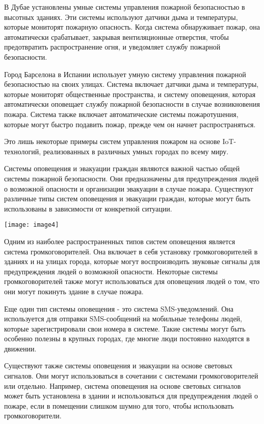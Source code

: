 \begin{multicols}{2}
В Дубае установлены умные системы управления пожарной безопасностью в
высотных зданиях. Эти системы используют датчики дыма и температуры,
которые мониторят пожарную опасность. Когда система обнаруживает
пожар, она автоматически срабатывает, закрывая вентиляционные
отверстия, чтобы предотвратить распространение огня, и уведомляет
службу пожарной безопасности.

Город Барселона в Испании использует умную систему управления пожарной
безопасностью на своих улицах. Система включает датчики дыма и
температуры, которые мониторят общественные пространства, и систему
оповещения, которая автоматически оповещает службу пожарной
безопасности в случае возникновения пожара. Система также включает
автоматические системы пожаротушения, которые могут быстро подавить
пожар, прежде чем он начнет распространяться.

Это лишь некоторые примеры систем управления пожаром на основе
IoT-технологий, реализованных в различных умных городах по всему миру.

Системы оповещения и эвакуации граждан являются важной частью общей
системы пожарной безопасности. Они предназначены для предупреждения
людей о возможной опасности и организации эвакуации в случае пожара.
Существуют различные типы систем оповещения и эвакуации граждан, которые
могут быть использованы в зависимости от конкретной ситуации.

{\centering
\texttt{[image: image4]}
}

Одним из наиболее распространенных типов систем оповещения является
система громкоговорителей. Она включает в себя установку
громкоговорителей в зданиях и на улицах города, которые могут
воспроизводить звуковые сигналы для предупреждения людей о возможной
опасности. Некоторые системы громкоговорителей также могут
использоваться для оповещения людей о том, что они могут покинуть здание
в случае пожара.

Еще один тип системы оповещения - это система SMS-уведомлений. Она
используется для отправки SMS-сообщений на мобильные телефоны людей,
которые зарегистрировали свои номера в системе. Такие системы могут быть
особенно полезны в крупных городах, где многие люди постоянно находятся
в движении.

Существуют также системы оповещения и эвакуации на основе световых
сигналов. Они могут использоваться в сочетании с системами
громкоговорителей или отдельно. Например, система оповещения на основе
световых сигналов может быть установлена в здании и использоваться для
предупреждения людей о пожаре, если в помещении слишком шумно для того,
чтобы использовать громкоговорители.


\end{multicols}
